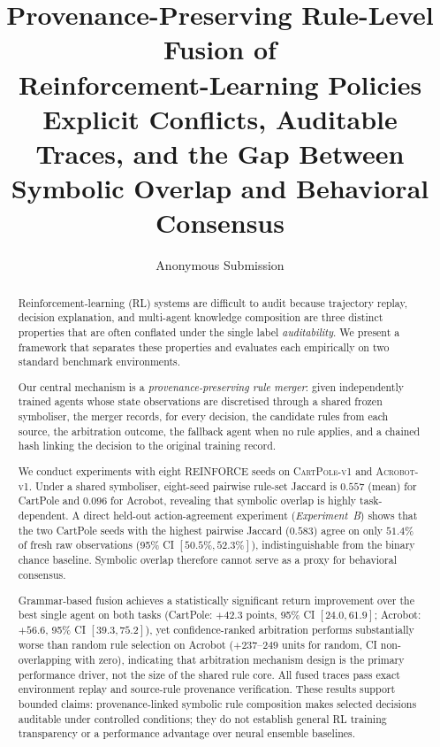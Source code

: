 \documentclass[12pt]{article}
\begin{document}
\title{\textbf{Provenance-Preserving Rule-Level Fusion of\\
Reinforcement-Learning Policies}\\[4pt]
\large Explicit Conflicts, Auditable Traces, and the Gap Between\\
Symbolic Overlap and Behavioral Consensus}

\author{Anonymous Submission}
\date{}
\maketitle

\begin{abstract}
Reinforcement-learning (RL) systems are difficult to audit because
trajectory replay, decision explanation, and multi-agent knowledge composition
are three distinct properties that are often conflated under the single label
\emph{auditability}.
We present a framework that separates these properties and evaluates each
empirically on two standard benchmark environments.

Our central mechanism is a \emph{provenance-preserving rule merger}:
given independently trained agents whose state observations are discretised
through a shared frozen symboliser, the merger records, for every decision,
the candidate rules from each source, the arbitration outcome, the fallback
agent when no rule applies, and a chained hash linking the decision to the
original training record.

We conduct experiments with eight REINFORCE seeds on
\textsc{CartPole-v1} and \textsc{Acrobot-v1}.
Under a shared symboliser, eight-seed pairwise rule-set
Jaccard is $0.557$ (mean) for CartPole and $0.096$ for Acrobot,
revealing that symbolic overlap is highly task-dependent.
A direct held-out action-agreement experiment (\emph{Experiment~B})
shows that the two CartPole seeds with the highest pairwise Jaccard ($0.583$)
agree on only $51.4\%$ of fresh raw observations
(95\% CI $[50.5\%, 52.3\%]$), indistinguishable from the binary chance baseline.
Symbolic overlap therefore cannot serve as a proxy for behavioral consensus.

Grammar-based fusion achieves a statistically significant return improvement
over the best single agent on both tasks
(CartPole: $+42.3$ points, 95\% CI $[24.0, 61.9]$;
Acrobot: $+56.6$, 95\% CI $[39.3, 75.2]$),
yet confidence-ranked arbitration performs substantially worse than
random rule selection on Acrobot ($+237$--$249$ units for random,
CI non-overlapping with zero),
indicating that arbitration mechanism design is the primary performance driver,
not the size of the shared rule core.
All fused traces pass exact environment replay and source-rule
provenance verification.
These results support bounded claims: provenance-linked symbolic
rule composition makes selected decisions auditable under controlled
conditions; they do not establish general RL training transparency
or a performance advantage over neural ensemble baselines.
\end{abstract}
\end{document}
